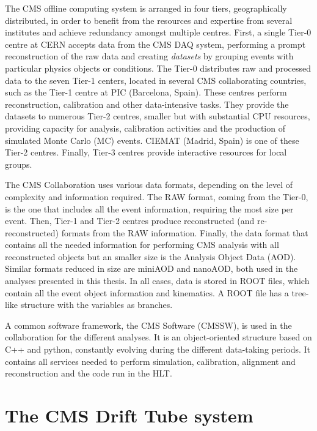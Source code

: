 \documentclass[../main.tex]{subfiles}
\begin{document}
The CMS offline computing system \cite{intro:exp:cms_computing} is arranged in four tiers, geographically distributed, in order to benefit from the resources and expertise from several ins\-ti\-tu\-tes and achieve redundancy amongst multiple centres. First, a single Tier-0 centre at CERN accepts data from the CMS DAQ system, performing a prompt reconstruction of the raw data and creating \textit{datasets} by grouping events with particular physics objects or conditions. The Tier-0 distributes raw and processed data to the seven Tier-1 centers, located in several CMS collaborating countries, such as the Tier-1 centre at PIC (Barcelona, Spain). These centres perform reconstruction, calibration and other data-intensive tasks. They provide the datasets to numerous Tier-2 centres, smaller but with substantial CPU resources, providing capacity for analysis, calibration activities and the production of simulated Monte Carlo (MC) events. CIEMAT (Madrid, Spain) is one of these Tier-2 centres. Finally, Tier-3 centres provide interactive resources for local groups.

The CMS Collaboration uses various data formats, depending on the level of complexity and information required. The RAW format, coming from the Tier-0, is the one that includes all the event information, requiring the most size per event. Then, Tier-1 and Tier-2 centres produce reconstructed (and re-reconstructed) formats from the RAW information. Finally, the data format that contains all the needed information for performing CMS analysis with all reconstructed objects but an smaller size is the Analysis Object Data (AOD). Similar formats reduced in size are miniAOD and nanoAOD, both used in the analyses presented in this thesis. In all cases, data is stored in ROOT \cite{intro:exp:root} files, which contain all the event object information and kinematics. A ROOT file has a tree-like structure with the variables as branches.

A common software framework, the CMS Software (CMSSW), is used in the collaboration for the different analyses. It is an object-oriented structure based on C++ and python, constantly evolving during the different data-taking periods. It contains all services needed to perform simulation, calibration, alignment and reconstruction and the code run in the HLT. 

\section{The CMS Drift Tube system}
\label{intro:sec:dts}
\end{document}
